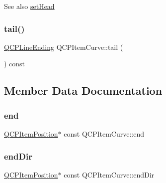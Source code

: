 \begin{DoxySeeAlso}{See also}
\mbox{\hyperlink{class_q_c_p_item_curve_a08a30d9cdd63995deea3d9e20430676f}{set\+Head}} 
\end{DoxySeeAlso}
\mbox{\label{class_q_c_p_item_curve_aaef82aa581f6996444028027d6829acc}} 
\subsubsection{\texorpdfstring{tail()}{tail()}}
{\footnotesize\ttfamily \mbox{\hyperlink{class_q_c_p_line_ending}{Q\+C\+P\+Line\+Ending}} Q\+C\+P\+Item\+Curve\+::tail (\begin{DoxyParamCaption}{ }\end{DoxyParamCaption}) const\hspace{0.3cm}{\ttfamily [inline]}}



\subsection{Member Data Documentation}
\mbox{\label{class_q_c_p_item_curve_a24ecbb195b32a08b42b61c2cf08a1b4d}} 
\subsubsection{\texorpdfstring{end}{end}}
{\footnotesize\ttfamily \mbox{\hyperlink{class_q_c_p_item_position}{Q\+C\+P\+Item\+Position}}$\ast$ const Q\+C\+P\+Item\+Curve\+::end}

\mbox{\label{class_q_c_p_item_curve_a28181a9dee9cc3c3da83a883221bd2d0}} 
\subsubsection{\texorpdfstring{endDir}{endDir}}
{\footnotesize\ttfamily \mbox{\hyperlink{class_q_c_p_item_position}{Q\+C\+P\+Item\+Position}}$\ast$ const Q\+C\+P\+Item\+Curve\+::end\+Dir}

\mbox{\label{class_q_c_p_item_curve_af2cc26ff199570940dc96f5ec19a13f8}} 
